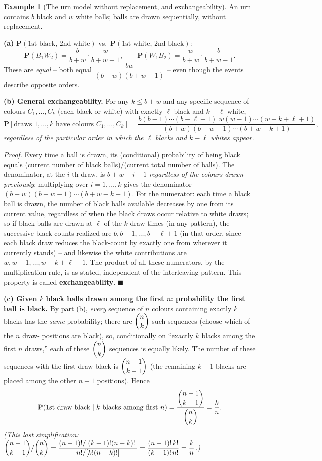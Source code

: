 \documentclass[11pt]{article}
\theoremstyle{definition}
\newtheorem{example}[definition]{Example}
\theoremstyle{plain}
\theoremstyle{remark}
\begin{document}
\begin{example}[The urn model without replacement, and exchangeability]
\label{ex:urn}
An urn contains $b$ black and $w$ white balls; balls are drawn sequentially, without replacement.

\textbf{(a)} $\mathbf{P}(\text{1st black, 2nd white})$ vs.\ $\mathbf{P}(\text{1st white, 2nd
black})$:
\[
\mathbf{P}(B_1 W_2) = \frac{b}{b+w}\cdot\frac{w}{b+w-1}, \qquad
\mathbf{P}(W_1 B_2) = \frac{w}{b+w}\cdot\frac{b}{b+w-1}.
\]
These are \emph{equal} -- both equal $\dfrac{bw}{(b+w)(b+w-1)}$ -- even though the events describe
opposite orders.

\textbf{(b) General exchangeability.} For any $k \le b+w$ and any specific sequence of colours
$C_1,\dots,C_k$ (each black or white) with exactly $\ell$ black and $k-\ell$ white,
\[
\mathbf{P}[\text{draws } 1,\dots,k \text{ have colours } C_1,\dots,C_k]
= \frac{b(b-1)\cdots(b-\ell+1)\;w(w-1)\cdots(w-k+\ell+1)}{(b+w)(b+w-1)\cdots(b+w-k+1)},
\]
\emph{regardless of the particular order in which the $\ell$ blacks and $k-\ell$ whites appear.}

\emph{Proof.} Every time a ball is drawn, its (conditional) probability of being black equals
(current number of black balls)/(current total number of balls). The denominator, at the $i$-th
draw, is $b+w-i+1$ \emph{regardless of the colours drawn previously}; multiplying over
$i=1,\dots,k$ gives the denominator $(b+w)(b+w-1)\cdots(b+w-k+1)$. For the numerator: each time a
black ball is drawn, the number of black balls available decreases by one from its current value,
regardless of when the black draws occur relative to white draws; so if black balls are drawn at
$\ell$ of the $k$ draw-times (in any pattern), the successive black-counts realized are
$b, b-1,\dots,b-\ell+1$ (in that order, since each black draw reduces the black-count by exactly
one from wherever it currently stands) -- and likewise the white contributions are
$w,w-1,\dots,w-k+\ell+1$. The product of all these numerators, by the multiplication rule, is as
stated, independent of the interleaving pattern. This property is called \textbf{exchangeability}.
$\blacksquare$

\textbf{(c) Given $k$ black balls drawn among the first $n$: probability the first ball is
black.} By part (b), \emph{every} sequence of $n$ colours containing exactly $k$ blacks has the
\emph{same} probability; there are $\dbinom{n}{k}$ such sequences (choose which of the $n$ draw-
positions are black), so, conditionally on ``exactly $k$ blacks among the first $n$ draws,'' each
of these $\dbinom{n}{k}$ sequences is equally likely. The number of these sequences with the first
draw black is $\dbinom{n-1}{k-1}$ (the remaining $k-1$ blacks are placed among the other $n-1$
positions). Hence
\[
\mathbf{P}(\text{1st draw black} \mid k \text{ blacks among first } n)
= \frac{\dbinom{n-1}{k-1}}{\dbinom{n}{k}} = \frac{k}{n}.
\]
\emph{(This last simplification: $\dbinom{n-1}{k-1}/\dbinom{n}{k} =
\dfrac{(n-1)!/[(k-1)!(n-k)!]}{n!/[k!(n-k)!]} = \dfrac{(n-1)!\,k!}{(k-1)!\,n!}=\dfrac{k}{n}$.)}
\end{example}
\end{document}
